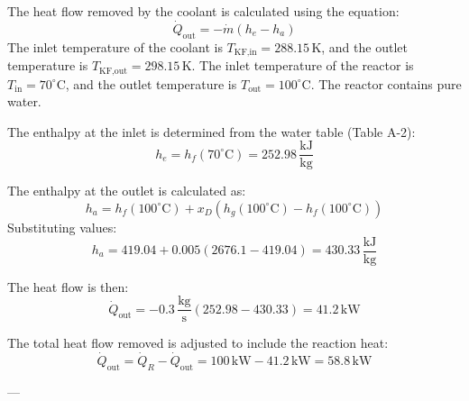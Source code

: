 The heat flow removed by the coolant is calculated using the equation:  
\[
\dot{Q}_{\text{out}} = -\dot{m} \left( h_e - h_a \right)
\]  
The inlet temperature of the coolant is \( T_{\text{KF,in}} = 288.15 \, \text{K} \), and the outlet temperature is \( T_{\text{KF,out}} = 298.15 \, \text{K} \). The inlet temperature of the reactor is \( T_{\text{in}} = 70^\circ\text{C} \), and the outlet temperature is \( T_{\text{out}} = 100^\circ\text{C} \). The reactor contains pure water.  

The enthalpy at the inlet is determined from the water table (Table A-2):  
\[
h_e = h_f(70^\circ\text{C}) = 252.98 \, \frac{\text{kJ}}{\text{kg}}
\]  

The enthalpy at the outlet is calculated as:  
\[
h_a = h_f(100^\circ\text{C}) + x_D \left( h_g(100^\circ\text{C}) - h_f(100^\circ\text{C}) \right)
\]  
Substituting values:  
\[
h_a = 419.04 + 0.005 \left( 2676.1 - 419.04 \right) = 430.33 \, \frac{\text{kJ}}{\text{kg}}
\]  

The heat flow is then:  
\[
\dot{Q}_{\text{out}} = -0.3 \, \frac{\text{kg}}{\text{s}} \left( 252.98 - 430.33 \right) = 41.2 \, \text{kW}
\]  

The total heat flow removed is adjusted to include the reaction heat:  
\[
\dot{Q}_{\text{out}} = \dot{Q}_R - \dot{Q}_{\text{out}} = 100 \, \text{kW} - 41.2 \, \text{kW} = 58.8 \, \text{kW}
\]  

---